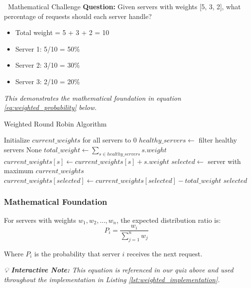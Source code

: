 \documentclass[12pt,a4paper]{article}
\begin{document}
\begin{quizbox}{🧮 Mathematical Challenge}
\textbf{Question:} Given servers with weights [5, 3, 2], what percentage of requests should each server handle?
\begin{itemize}
    \item Total weight = 5 + 3 + 2 = 10
    \item Server 1: 5/10 = 50\%
    \item Server 2: 3/10 = 30\%
    \item Server 3: 2/10 = 20\%
\end{itemize}
\textit{This demonstrates the mathematical foundation in equation \eqref{eq:weighted_probability} below.}
\end{quizbox}

\begin{algorithm}
\caption{Weighted Round Robin Algorithm}
\begin{algorithmic}[1]
\STATE Initialize $current\_weights$ for all servers to 0
    \STATE $healthy\_servers \leftarrow$ filter healthy servers
        \RETURN None
    \ENDIF
    \STATE $total\_weight \leftarrow \sum_{s \in healthy\_servers} s.weight$
        \STATE $current\_weights[s] \leftarrow current\_weights[s] + s.weight$
    \ENDFOR
    \STATE $selected \leftarrow$ server with maximum $current\_weights$
    \STATE $current\_weights[selected] \leftarrow current\_weights[selected] - total\_weight$
    \RETURN $selected$
\ENDWHILE
\end{algorithmic}
\end{algorithm}

\subsubsection{Mathematical Foundation}
For servers with weights $w_1, w_2, ..., w_n$, the expected distribution ratio is:
\begin{equation}
P_i = \frac{w_i}{\sum_{j=1}^{n} w_j}
\label{eq:weighted_probability}
\end{equation}

Where $P_i$ is the probability that server $i$ receives the next request.

\textit{💡 \textbf{Interactive Note:} This equation is referenced in our quiz above and used throughout the implementation in Listing \ref{lst:weighted_implementation}.}
\end{document}

